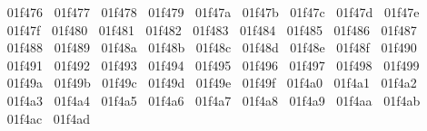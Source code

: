 {  ^^^^^^01f476%
  ^^^^^^01f477%
  ^^^^^^01f478%
  ^^^^^^01f479%
  ^^^^^^01f47a%
  ^^^^^^01f47b%
  ^^^^^^01f47c%
  ^^^^^^01f47d%
  ^^^^^^01f47e%
  ^^^^^^01f47f%
  ^^^^^^01f480%
  ^^^^^^01f481%
  ^^^^^^01f482%
  ^^^^^^01f483%
  ^^^^^^01f484%
  ^^^^^^01f485%
  ^^^^^^01f486%
  ^^^^^^01f487%
  ^^^^^^01f488%
  ^^^^^^01f489%
  ^^^^^^01f48a%
  ^^^^^^01f48b%
  ^^^^^^01f48c%
  ^^^^^^01f48d%
  ^^^^^^01f48e%
  ^^^^^^01f48f%
  ^^^^^^01f490%
  ^^^^^^01f491%
  ^^^^^^01f492%
  ^^^^^^01f493%
  ^^^^^^01f494%
  ^^^^^^01f495%
  ^^^^^^01f496%
  ^^^^^^01f497%
  ^^^^^^01f498%
  ^^^^^^01f499%
  ^^^^^^01f49a%
  ^^^^^^01f49b%
  ^^^^^^01f49c%
  ^^^^^^01f49d%
  ^^^^^^01f49e%
  ^^^^^^01f49f%
  ^^^^^^01f4a0%
  ^^^^^^01f4a1%
  ^^^^^^01f4a2%
  ^^^^^^01f4a3%
  ^^^^^^01f4a4%
  ^^^^^^01f4a5%
  ^^^^^^01f4a6%
  ^^^^^^01f4a7%
  ^^^^^^01f4a8%
  ^^^^^^01f4a9%
  ^^^^^^01f4aa%
  ^^^^^^01f4ab%
  ^^^^^^01f4ac%
  ^^^^^^01f4ad%
}
